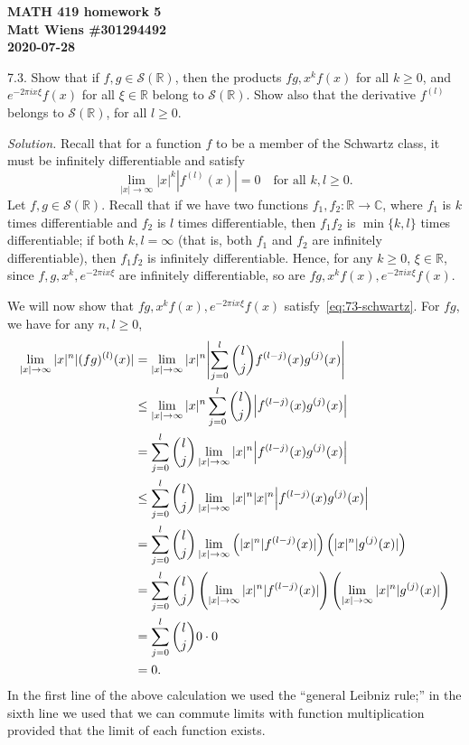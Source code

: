 \documentclass{article}
\newcommand{\C}{\mathbb{C}}
\newcommand{\R}{\mathbb{R}}
\newcommand{\fS}{\mathcal{S}}
\begin{document}
\textbf{MATH 419 homework 5} \\
\textbf{Matt Wiens \#301294492} \\
\textbf{2020-07-28}

7.3. Show that if $f, g \in \fS(\R)$, then the products
$fg, x^kf(x)$ for all $k \geq 0$, and $e^{-2 \pi i x \xi}f(x)$
for all $\xi \in \R$ belong to $\fS(\R)$. Show also that the
derivative $f^{(l)}$ belongs to $\fS(\R)$, for all $l \geq 0$.

\textit{Solution.}
Recall that for a function $f$ to be a member of the Schwartz
class, it must be infinitely differentiable and satisfy
%
\begin{equation}
    \lim_{|x| \to \infty} |x|^k |f^{(l)}(x)| = 0 \quad \text{for all $k, l \geq 0$}
    .
    \label{eq:73-schwartz}
\end{equation}
%
Let $f, g \in \fS(\R)$. Recall that if we have two functions $f_1, f_2:
\R \to \C$, where $f_1$ is $k$ times differentiable and $f_2$ is $l$
times differentiable, then $f_1 f_2$ is $\min \{k, l\}$ times
differentiable; if both $k, l = \infty$ (that is, both $f_1$ and $f_2$
are infinitely differentiable), then $f_1 f_2$ is infinitely
differentiable. Hence, for any $k \geq 0$, $\xi \in \R$, since
$f, g, x^k, e^{-2 \pi i x \xi}$ are infinitely differentiable,
so are $fg, x^k f(x), e^{- 2 \pi i x \xi} f(x)$.

We will now show that $fg, x^k f(x), e^{- 2 \pi i x \xi} f(x)$
satisfy~\eqref{eq:73-schwartz}. For $fg$, we have for any $n, l \geq 0$,
%
\begin{align*}
    \lim_{|x| \to \infty} |x|^n |(fg)^{(l)}(x)|
        &= \lim_{|x| \to \infty} |x|^n \envert[4]{\sum_{j = 0}^l \binom{l}{j} f^{(l - j)}(x) g^{(j)}(x)} \\
        &\leq \lim_{|x| \to \infty} |x|^n \sum_{j = 0}^l \binom{l}{j} \envert{f^{(l - j)}(x) g^{(j)}(x)} \\
        &= \sum_{j = 0}^l \binom{l}{j} \lim_{|x| \to \infty} |x|^n \envert{f^{(l - j)}(x) g^{(j)}(x)} \\
        &\leq \sum_{j = 0}^l \binom{l}{j} \lim_{|x| \to \infty} |x|^n |x|^n \envert{f^{(l - j)}(x) g^{(j)}(x)} \\
        &= \sum_{j = 0}^l \binom{l}{j} \lim_{|x| \to \infty} \del{|x|^n |f^{(l - j)}(x)|} \del{|x|^n |g^{(j)}(x)|} \\
        &= \sum_{j = 0}^l \binom{l}{j} \del{\lim_{|x| \to \infty} |x|^n |f^{(l - j)}(x)|} \del{\lim_{|x| \to \infty} |x|^n |g^{(j)}(x)|} \\
        &= \sum_{j = 0}^l \binom{l}{j} 0 \cdot 0 \\
        &= 0
    .
\end{align*}
%
In the first line of the above calculation we used the ``general Leibniz
rule;'' in the sixth line we used that we can commute limits with
function multiplication provided that the limit of each function exists.
\end{document}
